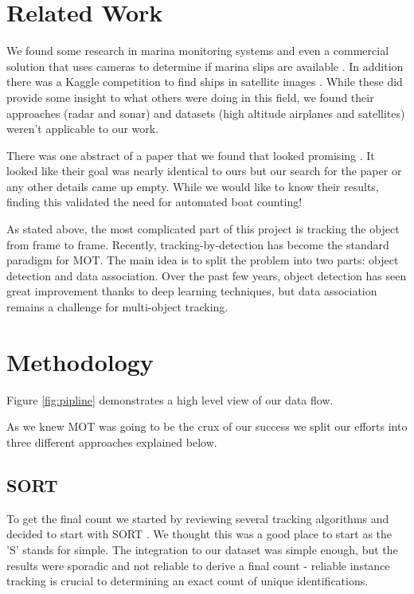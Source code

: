 \documentclass[10pt,twocolumn,letterpaper]{article}
\begin{document}
\section{Related Work}

We found some research in marina monitoring systems \cite{marina_boatdetector} and even a commercial solution that uses cameras to determine if marina slips are available \cite{Nuvis}. In addition there was a Kaggle competition to find ships in satellite images \cite{kaggle_ship_detection, Stofa_2020}. While these did provide some insight to what others were doing in this field, we found their approaches (radar and sonar) and datasets (high altitude airplanes and satellites) weren't applicable to our work.

There was one abstract of a paper that we found that looked promising \cite{UCalagary}. It looked like their goal was nearly identical to ours but our search for the paper or any other details came up empty. While we would like to know their results, finding this validated the need for automated boat counting!

As stated above, the most complicated part of this project is tracking the object from frame to frame. Recently, tracking-by-detection has become the standard paradigm for MOT. The main idea is to split the problem into two parts: object detection and data association. Over the past few years, object detection has seen great improvement thanks to deep learning techniques\cite{https://doi.org/10.48550/arxiv.1506.01497}, but data association remains a challenge for multi-object tracking.

\section{Methodology}

Figure \ref{fig:pipline} demonstrates a high level view of our data flow. 

As we knew MOT was going to be the crux of our success we split our efforts into three different approaches explained below.

\subsection{SORT}

To get the final count we started by reviewing several tracking algorithms and decided to start with SORT \cite{Bewley_2016}. We thought this was a good place to start as the 'S' stands for simple.  The integration to our dataset was simple enough, but the results were sporadic and not reliable to derive a final count - reliable instance tracking is crucial to determining an exact count of unique identifications.
\end{document}
